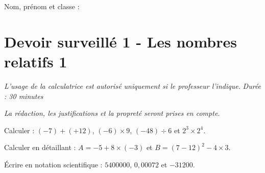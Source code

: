 \documentclass[a4paper,10pt]{report}
\begin{document}
\pagestyle{empty}
\noindent Nom, prénom et classe : \dotfill

\section*{Devoir surveillé 1 - Les nombres relatifs 1}

\noindent \textit{L'usage de la calculatrice est autorisé uniquement si le professeur l'indique.} \hfill \textit{Durée : 30 minutes}

\medskip
\noindent \textit{La rédaction, les justifications et la propreté seront prises en compte.}


\begin{ex}[Calculs]
Calculer : $(-7)+(+12)$, $(-6)\times 9$, $(-48)\div 6$ et $2^3\times2^4$.
\medskip\noindent\grandscarreaux{\linewidth}{4cm}
\end{ex}
\begin{ex}[Priorités]
Calculer en détaillant : $A=-5+8\times(-3)$ et $B=(7-12)^2-4\times3$.
\medskip\noindent\grandscarreaux{\linewidth}{4cm}
\end{ex}
\begin{ex}
Écrire en notation scientifique : $5400000$, $0,00072$ et $-31200$.
\medskip\noindent\grandscarreaux{\linewidth}{3cm}
\end{ex}
\end{document}
